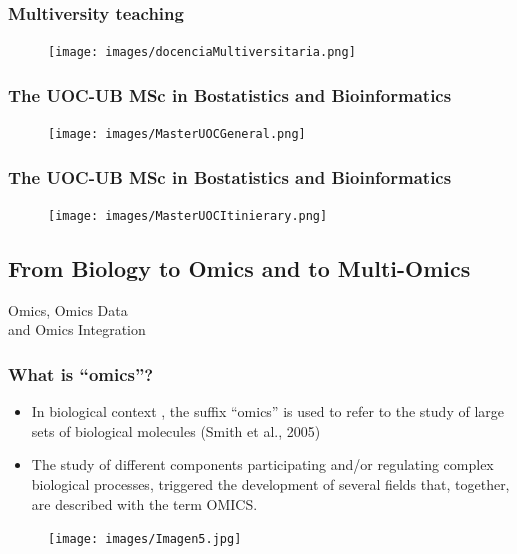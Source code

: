 \documentclass{beamer}
\begin{document}
 \begin{frame}
 	\frametitle{Multiversity teaching}
 	\begin{figure}[ht]
 		\centering
 		\texttt{[image: images/docenciaMultiversitaria.png]}
 	\end{figure}
 \end{frame}

\begin{frame}
	\frametitle{The UOC-UB MSc in Bostatistics and Bioinformatics}
	\begin{figure}[ht]
		\centering
		\texttt{[image: images/MasterUOCGeneral.png]}
	\end{figure}
\end{frame}
 
 
 \begin{frame}
 	\frametitle{The UOC-UB MSc in Bostatistics and Bioinformatics}
 	\begin{figure}[ht]
 		\centering
 		\texttt{[image: images/MasterUOCItinierary.png]}
 	\end{figure}
 \end{frame}
 
 
 \subsection{From Biology to Omics and to Multi-Omics} 
  
  \begin{frame}
  \begin{center}
  	Omics, Omics Data \\ and Omics Integration 
  \end{center} 	
  \end{frame}
  
  \begin{frame}
  	\frametitle{What is ``omics''?}
  	\begin{itemize}
  		\item In biological context , the suffix ``omics'' is used to refer to the study of large sets of biological molecules (Smith et al., 2005)
  		\item The study of different components participating and/or regulating complex biological processes, triggered the development of several fields that, together, are described with the term OMICS.
  	\end{itemize}
  		\begin{figure}[ht]
  			\centering
  			\texttt{[image: images/Imagen5.jpg]}
  		\end{figure} 
  \end{frame}
  
\end{document}
